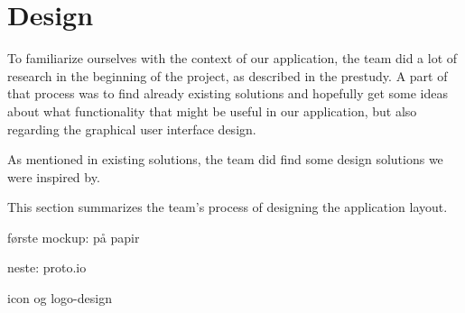 \section{Design}
To familiarize ourselves with the context of our application, the team did a lot of research in the beginning of the project, as described in the prestudy. A part of that process was to find already existing solutions and hopefully get some ideas about what functionality that might be useful in our application, but also regarding the graphical user interface design.

As mentioned in  existing solutions, the team did find some design solutions we were inspired by.

This section summarizes the team's process of designing the application layout.

første mockup:
på papir

neste:
proto.io

icon og logo-design